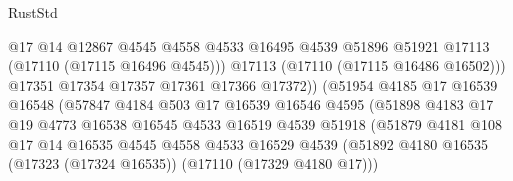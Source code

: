 \begin{lexlean}{RustStd}
\begin{coremodule}
                                      @17
                                      @14
                                      @12867
                                      @4545
                                      @4558
                                      @4533
                                      @16495
                                      @4539
                                      @51896
                                      @51921
                                      @17113
                                      (@17110 (@17115 @16496 @4545)))
                                    @17113
                                    (@17110 (@17115 @16486 @16502)))
                                  @17351
                                  @17354
                                  @17357
                                  @17361
                                  @17366
                                  @17372))
                              (@51954
                                @4185
                                @17
                                @16539
                                @16548
                                (@57847
                                  @4184
                                  @503
                                  @17
                                  @16539
                                  @16546
                                  @4595
                                  (@51898
                                    @4183
                                    @17
                                    @19
                                    @4773
                                    @16538
                                    @16545
                                    @4533
                                    @16519
                                    @4539
                                    @51918
                                    (@51879
                                      @4181
                                      @108
                                      @17
                                      @14
                                      @16535
                                      @4545
                                      @4558
                                      @4533
                                      @16529
                                      @4539
                                      (@51892
                                        @4180
                                        @16535
                                        (@17323 (@17324 @16535))
                                        (@17110 (@17329 @4180 @17)))

\end{coremodule}
\end{lexlean}
